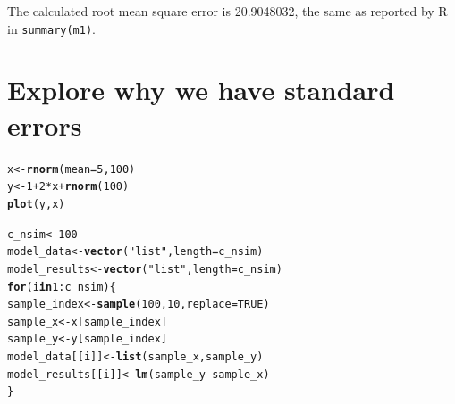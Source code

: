 \documentclass{article}\usepackage[]{graphicx}\usepackage[]{color}
\makeatletter
\newcommand{\hlnum}[1]{\textcolor[rgb]{0.686,0.059,0.569}{#1}}%
\newcommand{\hlstr}[1]{\textcolor[rgb]{0.192,0.494,0.8}{#1}}%
\newcommand{\hlopt}[1]{\textcolor[rgb]{0,0,0}{#1}}%
\newcommand{\hlstd}[1]{\textcolor[rgb]{0.345,0.345,0.345}{#1}}%
\newcommand{\hlkwa}[1]{\textcolor[rgb]{0.161,0.373,0.58}{\textbf{#1}}}%
\newcommand{\hlkwb}[1]{\textcolor[rgb]{0.69,0.353,0.396}{#1}}%
\newcommand{\hlkwc}[1]{\textcolor[rgb]{0.333,0.667,0.333}{#1}}%
\newcommand{\hlkwd}[1]{\textcolor[rgb]{0.737,0.353,0.396}{\textbf{#1}}}%
\newenvironment{kframe}{%
 \def\at@end@of@kframe{}%
 \ifinner\ifhmode%
  \def\at@end@of@kframe{\end{minipage}}%
  \begin{minipage}{\columnwidth}%
 \fi\fi%
 \def\FrameCommand##1{\hskip\@totalleftmargin \hskip-\fboxsep
 \colorbox{shadecolor}{##1}\hskip-\fboxsep
     \hskip-\linewidth \hskip-\@totalleftmargin \hskip\columnwidth}%
 \MakeFramed {\advance\hsize-\width
   \@totalleftmargin\z@ \linewidth\hsize
   \@setminipage}}%
 {\par\unskip\endMakeFramed%
 \at@end@of@kframe}
\newenvironment{knitrout}{}{} %
\makeatother
\begin{document}
The calculated root mean square error is 20.9048032, the same as reported by R in \verb`summary(m1)`.

\section{Explore why we have standard errors}

\begin{knitrout}
\color{fgcolor}\begin{kframe}
\begin{alltt}
\hlstd{x} \hlkwb{<-} \hlkwd{rnorm}\hlstd{(}\hlkwc{mean} \hlstd{=} \hlnum{5}\hlstd{,} \hlnum{100}\hlstd{)}
\hlstd{y} \hlkwb{<-} \hlnum{1} \hlopt{+} \hlnum{2} \hlopt{*} \hlstd{x} \hlopt{+} \hlkwd{rnorm}\hlstd{(}\hlnum{100}\hlstd{)}
\hlkwd{plot}\hlstd{(y, x)}

\hlstd{c_nsim} \hlkwb{<-} \hlnum{100}
\hlstd{model_data} \hlkwb{<-} \hlkwd{vector}\hlstd{(}\hlstr{"list"}\hlstd{,} \hlkwc{length} \hlstd{= c_nsim)}
\hlstd{model_results} \hlkwb{<-} \hlkwd{vector}\hlstd{(}\hlstr{"list"}\hlstd{,} \hlkwc{length} \hlstd{= c_nsim)}
\hlkwa{for} \hlstd{(i} \hlkwa{in} \hlnum{1}\hlopt{:}\hlstd{c_nsim) \{}
  \hlstd{sample_index} \hlkwb{<-} \hlkwd{sample}\hlstd{(}\hlnum{100}\hlstd{,} \hlnum{10}\hlstd{,} \hlkwc{replace} \hlstd{=} \hlnum{TRUE}\hlstd{)}
  \hlstd{sample_x} \hlkwb{<-} \hlstd{x[sample_index]}
  \hlstd{sample_y} \hlkwb{<-} \hlstd{y[sample_index]}
  \hlstd{model_data[[i]]} \hlkwb{<-} \hlkwd{list}\hlstd{(sample_x, sample_y)}
  \hlstd{model_results[[i]]} \hlkwb{<-} \hlkwd{lm}\hlstd{(sample_y} \hlopt{~} \hlstd{sample_x)}
\hlstd{\}}


\end{alltt}
\end{kframe}
\end{knitrout}
\end{document}
